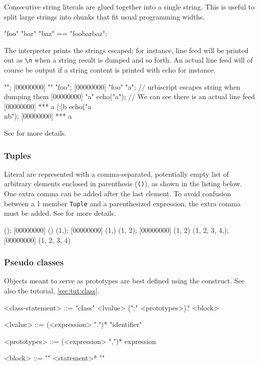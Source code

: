 Consecutive string literals are glued together into a single string.
This is useful to split large strings into chunks that fit usual
programming widths.

\begin{urbiassert}
"foo" "bar" "baz" == "foobarbaz";
\end{urbiassert}

The interpreter prints the strings escaped; for instance, line feed
will be printed out as \lstinline|\n| when a string result is dumped
and so forth. An actual line feed will of course be output if a string
content is printed with echo for instance.

\begin{urbiscript}
"";
[00000000] ""
"foo";
[00000000] "foo"
"a\nb"; // urbiscript escapes string when dumping them
[00000000] "a\nb"
echo("a\nb"); // We can see there is an actual line feed
[00000000] *** a
[:]b
echo("a\\nb");
[00000000] *** a\nb
\end{urbiscript}

See  for more details.

\subsubsection{Tuples}
\label{sec:us-syn-lit-tuples}

Literal  are represented with a comma-separated, potentially
empty list of arbitrary elements enclosed in parenthesis (\lstinline|()|),
as shown in the listing below.  One extra comma can be added after the last
element.  To avoid confusion between a 1 member \lstinline|Tuple| and a
parenthesized expression, the extra comma must be added.  See
 for more details.

\begin{urbiscript}
();
[00000000] ()
(1,);
[00000000] (1,)
(1, 2);
[00000000] (1, 2)
(1, 2, 3, 4,);
[00000000] (1, 2, 3, 4)
\end{urbiscript}


\subsubsection{Pseudo classes}
\label{sec:lang:class}

Objects meant to serve as prototypes are best defined using the
 construct.  See also the tutorial, \autoref{sec:tut:class}.

\begin{bnf}
<class-statement>
  ::= "class" <lvalue> (":" <prototypes>)? <block>

<lvalue>
  ::= (<expression> ".")* "identifier"

<prototypes>
  ::= (<expression> ",")* expression

<block>
  ::= "{" <statement>* "}"
\end{bnf}

